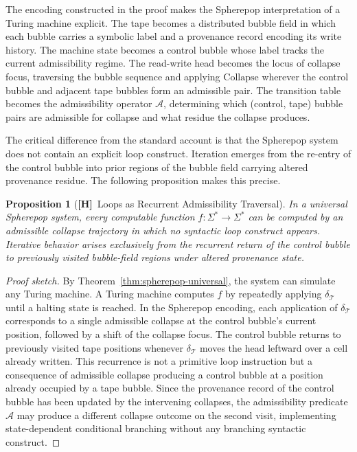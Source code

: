 \documentclass[11pt, oneside]{article}
\numberwithin{equation}{section}
\newcommand{\ClaimH}{\textcolor{rsvpgray}{\textbf{[H]}}}
\theoremstyle{rsvpstyle}
\newtheorem{proposition}[theorem]{Proposition}
\theoremstyle{remark}
\begin{document}
The encoding constructed in the proof makes the Spherepop interpretation of a Turing
machine explicit. The tape becomes a distributed bubble field in which each bubble
carries a symbolic label and a provenance record encoding its write history. The
machine state becomes a control bubble whose label tracks the current admissibility
regime. The read-write head becomes the locus of collapse focus, traversing the
bubble sequence and applying $\mathrm{Collapse}$ wherever the control bubble and
adjacent tape bubbles form an admissible pair. The transition table becomes the
admissibility operator $\mathcal{A}$, determining which (control, tape) bubble pairs
are admissible for collapse and what residue the collapse produces.

The critical difference from the standard account is that the Spherepop system does
not contain an explicit loop construct. Iteration emerges from the re-entry of the
control bubble into prior regions of the bubble field carrying altered provenance
residue. The following proposition makes this precise.

\begin{proposition}[\ClaimH\ Loops as Recurrent Admissibility Traversal]
\label{prop:loop-recurrence}
In a universal Spherepop system, every computable function $f : \Sigma^* \to \Sigma^*$
can be computed by an admissible collapse trajectory in which no syntactic loop
construct appears. Iterative behavior arises exclusively from the recurrent return
of the control bubble to previously visited bubble-field regions under altered
provenance state.
\end{proposition}

\begin{proof}[Proof sketch]
By Theorem~\ref{thm:spherepop-universal}, the system can simulate any Turing machine.
A Turing machine computes $f$ by repeatedly applying $\delta_\mathcal{T}$ until a
halting state is reached. In the Spherepop encoding, each application of
$\delta_\mathcal{T}$ corresponds to a single admissible collapse at the control bubble's
current position, followed by a shift of the collapse focus. The control bubble
returns to previously visited tape positions whenever $\delta_\mathcal{T}$ moves the
head leftward over a cell already written. This recurrence is not a primitive loop
instruction but a consequence of admissible collapse producing a control bubble at
a position already occupied by a tape bubble. Since the provenance record of the
control bubble has been updated by the intervening collapses, the admissibility
predicate $\mathcal{A}$ may produce a different collapse outcome on the second visit,
implementing state-dependent conditional branching without any branching syntactic
construct.
\end{proof}
\end{document}
